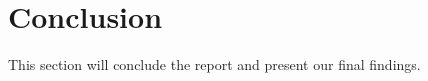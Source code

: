 \documentclass[../document.tex]{subfiles}
\begin{document}
\section{Conclusion}


This section will conclude the report and present our final findings.
\end{document}
